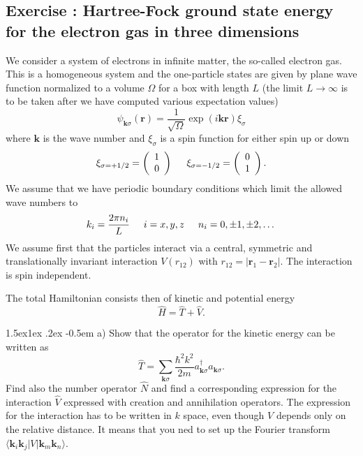 \documentclass[%
oneside,                 %
final,                   %
10pt]{article}
\makeatletter
\newenvironment{doconceexercise}{}{}
\newcounter{doconceexercisecounter}
\newcommand\subex{\@startsection{paragraph}{4}{\z@}%
                  {1.5ex\@plus1ex \@minus.2ex}%
                  {-0.5em}%
                  {\normalfont\normalsize\bfseries}}
\makeatother
\begin{document}
\begin{doconceexercise}

\subsection*{Exercise \thedoconceexercisecounter: Hartree-Fock ground state energy for the  electron gas in three dimensions}


We consider a system of electrons in infinite matter, the so-called electron gas. This is a homogeneous system and the one-particle states are given by plane wave function normalized to a volume $\Omega$ 
for a box with length $L$ (the limit $L\rightarrow \infty$ is to be taken after we have computed various expectation values)
\[
\psi_{\mathbf{k}\sigma}(\mathbf{r})= \frac{1}{\sqrt{\Omega}}\exp{(i\mathbf{kr})}\xi_{\sigma}
\]
where $\mathbf{k}$ is the wave number and  $\xi_{\sigma}$ is a spin function for either spin up or down
\[ 
\xi_{\sigma=+1/2}=\left(\begin{array}{c} 1 \\ 0 \end{array}\right) \hspace{0.5cm}
\xi_{\sigma=-1/2}=\left(\begin{array}{c} 0 \\ 1 \end{array}\right).
\]
We assume that we have periodic boundary conditions which limit the allowed wave numbers to
\[
k_i=\frac{2\pi n_i}{L}\hspace{0.5cm} i=x,y,z \hspace{0.5cm} n_i=0,\pm 1,\pm 2, \dots
\]
We assume first that the particles interact via a central, symmetric and translationally invariant
interaction  $V(r_{12})$ with
$r_{12}=|\mathbf{r}_1-\mathbf{r}_2|$.  The interaction is spin independent.

The total Hamiltonian consists then of kinetic and potential energy
\[
\hat{H} = \hat{T}+\hat{V}.
\]


\subex{a)}
Show that the operator for the kinetic energy can be written as
\[
\hat{T}=\sum_{\mathbf{k}\sigma}\frac{\hbar^2k^2}{2m}a_{\mathbf{k}\sigma}^{\dagger}a_{\mathbf{k}\sigma}.
\]
Find also the number operator $\hat{N}$ and find a corresponding expression for the interaction
$\hat{V}$ expressed with creation and annihilation operators.   The expression for the interaction
has to be written in  $k$ space, even though $V$ depends only on the relative distance. It means that you ned to set up the Fourier transform $\langle \mathbf{k}_i\mathbf{k}_j| V | \mathbf{k}_m\mathbf{k}_n\rangle$.


\end{doconceexercise}
\end{document}
